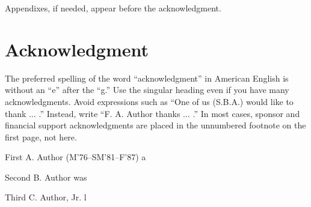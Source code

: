 \documentclass{IEEEtran}
\begin{document}
\appendices

Appendixes, if needed, appear before the acknowledgment.

\section*{Acknowledgment}

The preferred spelling of the word ``acknowledgment'' in American English is 
without an ``e'' after the ``g.'' Use the singular heading even if you have 
many acknowledgments. Avoid expressions such as ``One of us (S.B.A.) would 
like to thank $\ldots$ .'' Instead, write ``F. A. Author thanks $\ldots$ .'' In most 
cases, sponsor and financial support acknowledgments are placed in the 
unnumbered footnote on the first page, not here.





\begin{IEEEbiography}{First A. Author} (M'76--SM'81--F'87) a
\end{IEEEbiography}

\begin{IEEEbiography}{Second B. Author} was
\end{IEEEbiography}

\begin{IEEEbiography}{Third C. Author, Jr.} l
\end{IEEEbiography}
\end{document}
